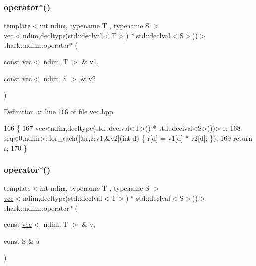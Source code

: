 \subsubsection{\texorpdfstring{operator$\ast$()}{operator*()}\hspace{0.1cm}{\footnotesize\ttfamily [1/6]}}
{\footnotesize\ttfamily template$<$int ndim, typename T , typename S $>$ \\
\hyperlink{structshark_1_1ndim_1_1vec}{vec}$<$ndim,decltype(std\+::declval$<$T$>$) $\ast$ std\+::declval$<$S$>$))$>$ shark\+::ndim\+::operator$\ast$ (\begin{DoxyParamCaption}\item[{const \hyperlink{structshark_1_1ndim_1_1vec}{vec}$<$ ndim, T $>$ \&}]{v1,  }\item[{const \hyperlink{structshark_1_1ndim_1_1vec}{vec}$<$ ndim, S $>$ \&}]{v2 }\end{DoxyParamCaption})\hspace{0.3cm}{\ttfamily [inline]}}



Definition at line 166 of file vec.\+hpp.


\begin{DoxyCode}
166                                                                                                            
                        \{
167             vec<ndim,decltype(std::declval<T>() * std::declval<S>())> r;
168             seq<0,ndim>::for\_each([&r,&v1,&v2](\textcolor{keywordtype}{int} d) \{ r[d] = v1[d] * v2[d]; \});
169             \textcolor{keywordflow}{return} r;
170         \}
\end{DoxyCode}
\hypertarget{namespaceshark_1_1ndim_afe2447ddf9376174429a7b4615ab4123}{}\label{namespaceshark_1_1ndim_afe2447ddf9376174429a7b4615ab4123} 
\subsubsection{\texorpdfstring{operator$\ast$()}{operator*()}\hspace{0.1cm}{\footnotesize\ttfamily [2/6]}}
{\footnotesize\ttfamily template$<$int ndim, typename T , typename S $>$ \\
\hyperlink{structshark_1_1ndim_1_1vec}{vec}$<$ndim,decltype(std\+::declval$<$T$>$) $\ast$ std\+::declval$<$S$>$))$>$ shark\+::ndim\+::operator$\ast$ (\begin{DoxyParamCaption}\item[{const \hyperlink{structshark_1_1ndim_1_1vec}{vec}$<$ ndim, T $>$ \&}]{v,  }\item[{const S \&}]{a }\end{DoxyParamCaption})\hspace{0.3cm}{\ttfamily [inline]}}




